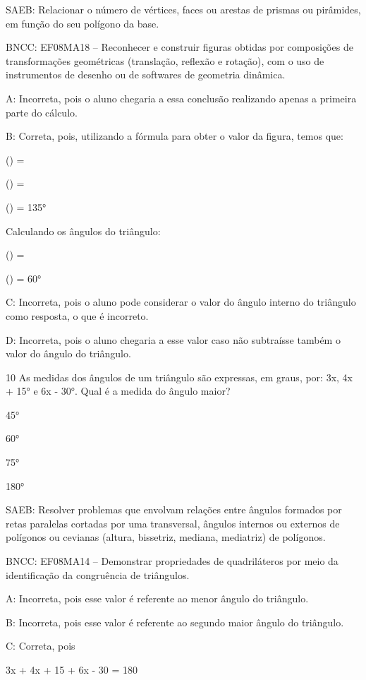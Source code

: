 {SAEB: Relacionar o número de vértices, faces ou arestas de prismas ou
pirâmides, em função do seu polígono da base.

BNCC: EF08MA18 -- Reconhecer e construir figuras obtidas por composições
de transformações geométricas (translação, reflexão e rotação), com o
uso de instrumentos de desenho ou de softwares de geometria dinâmica.

A: Incorreta, pois o aluno chegaria a essa conclusão realizando apenas a
primeira parte do cálculo.

B: Correta, pois, utilizando a fórmula para obter o valor da figura,
temos que:

() =

() =

() = 135°

Calculando os ângulos do triângulo:

() =

() = 60°

C: Incorreta, pois o aluno pode considerar o valor do ângulo interno do
triângulo como resposta, o que é incorreto.

D: Incorreta, pois o aluno chegaria a esse valor caso não subtraísse
também o valor do ângulo do triângulo.

\num{10} As medidas dos ângulos de um triângulo são expressas, em graus, por:
3x, 4x + 15° e 6x - 30°. Qual é a medida do ângulo maior?
\item 45°
\item 60°
\item 75°
\item 180°

SAEB: Resolver problemas que envolvam relações entre ângulos formados
por retas paralelas cortadas por uma transversal, ângulos internos ou
externos de polígonos ou cevianas (altura, bissetriz, mediana,
mediatriz) de polígonos.

BNCC: EF08MA14 -- Demonstrar propriedades de quadriláteros por meio da
identificação da congruência de triângulos.

A: Incorreta, pois esse valor é referente ao menor ângulo do triângulo.

B: Incorreta, pois esse valor é referente ao segundo maior ângulo do
triângulo.

C: Correta, pois

3x + 4x + 15 + 6x - 30 = 180

}
